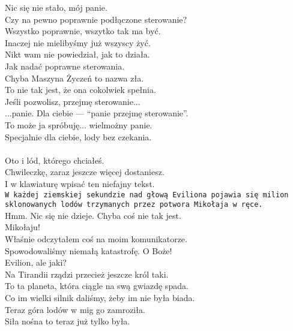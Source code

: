 \charprzy{}
Nic się nie stało, mój panie.\\
Czy na pewno poprawnie podłączone sterowanie?\\

\charmik{}
Wszystko poprawnie, wszytko tak ma być.\\
Inaczej nie mielibyśmy już wszyscy żyć.\\
Nikt wam nie powiedział, jak to działa.\\
Jak nadać poprawne sterowania.\\

\charprzy{}
Chyba Maszyna Życzeń to nazwa zła.\\
To nie tak jest, że ona cokolwiek spełnia.\\
Jeśli pozwolisz, przejmę sterowanie...\\

\chardokt{}
...panie.
Dla ciebie --- "`panie przejmę sterowanie"'.\\

\charmik{}
To może ja spróbuję... wielmożny panie.\\
Specjalnie dla ciebie, lody bez czekania.\\
\\
Oto i lód, którego chciałeś.\\
Chwileczkę, zaraz jeszcze więcej dostaniesz.\\
I w klawiaturę wpisać ten niefajny tekst.\\
\texttt{W każdej ziemskiej sekundzie nad głową Eviliona pojawia się milion sklonowanych lodów trzymanych przez potwora Mikołaja w ręce.}\\
Hmm. Nic się nie dzieje. Chyba coś nie tak jest.\\

\charnad{}
Mikołaju!\\
Właśnie odczytałem coś na moim komunikatorze. \\
Spowodowaliśmy niemałą katastrofę. O Boże!\\
Evilion, ale jaki?\\
Na Tirandii rządzi przecież jeszcze król taki.\\
To ta planeta, która ciągle na swą gwiazdę spada.\\
Co im wielki silnik daliśmy, żeby im nie była biada.\\
Teraz góra lodów w mig go zamroziła.\\
Siła nośna to teraz już tylko była.\\

